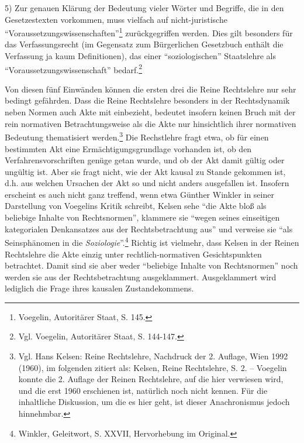 \documentclass[12pt,a4paper,ngerman]{article}
\begin{document}
5) Zur genauen Klärung der Bedeutung vieler Wörter und Begriffe, die in den
Gesetzestexten vorkommen, muss vielfach auf nicht-juristische
"`Voraussetzungswissenschaften"'\footnote{Voegelin, Autoritärer Staat, S.
  145.} zurückgegriffen werden. Dies gilt besonders für das Verfassungsrecht
(im Gegensatz zum Bürgerlichen Gesetzbuch enthält die Verfassung ja kaum
Definitionen), das einer "`soziologischen"' Staatslehre als
"`Voraussetzungswissenschaft"' bedarf.\footnote{Vgl. Voegelin, Autoritärer
  Staat, S.  144-147.}

Von diesen fünf Einwänden können die ersten drei die Reine Rechtslehre nur
sehr bedingt gefährden. Dass die Reine Rechtslehre besonders in der
Rechtsdynamik neben Normen auch Akte mit einbezieht, bedeutet insofern keinen
Bruch mit der rein normativen Betrachtungsweise als die Akte nur hinsichtlich
ihrer normativen Bedeutung thematisiert werden.\footnote{Vgl. Hans Kelsen:
  Reine Rechtslehre, Nachdruck der 2.  Auflage, Wien 1992 (1960), im folgenden
  zitiert als: Kelsen, Reine Rechtslehre, S. 2. -- Voegelin konnte die 2.
  Auflage der Reinen Rechtslehre, auf die hier verwiesen wird, und die erst
  1960 erschienen ist, natürlich noch nicht kennen. Für die inhaltliche
  Diskussion, um die es hier geht, ist dieser Anachronismus jedoch
  hinnehmbar.} Die Rechstlehre fragt etwa, ob für einen bestimmten Akt eine
Ermächtigungsgrundlage vorhanden ist, ob den Verfahrensvorschriften genüge
getan wurde, und ob der Akt damit gültig oder ungültig ist. Aber sie fragt
nicht, wie der Akt kausal zu Stande gekommen ist, d.h. aus welchen Ursachen der
Akt so und nicht anders ausgefallen ist. Insofern erscheint es auch nicht ganz
treffend, wenn etwa Günther Winkler in seiner Darstellung von Voegelins Kritik
schreibt, Kelsen sehe "`die Akte bloß als beliebige Inhalte von
Rechtsnormen"', klammere sie "`wegen seines einseitigen kategorialen
Denkansatzes aus der Rechtsbetrachtung aus"' und verweise sie "`als
Seinsphänomen in die {\em Soziologie}"'.\footnote{Winkler, Geleitwort, S.
  XXVII, Hervorhebung im Original.} Richtig ist vielmehr, dass Kelsen in der
Reinen Rechtslehre die Akte einzig unter rechtlich-normativen Gesichtspunkten
betrachtet. Damit sind sie aber weder "`beliebige Inhalte von Rechtsnormen"'
noch werden sie aus der Rechtsbetrachtung ausgeklammert. Ausgeklammert wird
lediglich die Frage ihres kausalen Zustandekommens.
\end{document}
